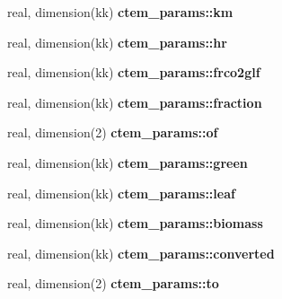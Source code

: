 \begin{DoxyCompactItemize}
\item 
\hypertarget{namespacectem__params_ad5efe1222fda4b5a9df48a9f7cf50c80}{}real, dimension(kk) {\bfseries ctem\+\_\+params\+::km}\label{namespacectem__params_ad5efe1222fda4b5a9df48a9f7cf50c80}

\item 
\hypertarget{namespacectem__params_a287abdadf856393dd133a8d5cfe1d05d}{}real, dimension(kk) {\bfseries ctem\+\_\+params\+::hr}\label{namespacectem__params_a287abdadf856393dd133a8d5cfe1d05d}

\item 
\hypertarget{namespacectem__params_a375be0a1145e49eeea706777032433d0}{}real, dimension(kk) {\bfseries ctem\+\_\+params\+::frco2glf}\label{namespacectem__params_a375be0a1145e49eeea706777032433d0}

\item 
\hypertarget{namespacectem__params_ae0ec764377ed519ca93ff09ad6dd3d39}{}real, dimension(kk) {\bfseries ctem\+\_\+params\+::fraction}\label{namespacectem__params_ae0ec764377ed519ca93ff09ad6dd3d39}

\item 
\hypertarget{namespacectem__params_a87b4020e0ac485788d2c248a82e457ed}{}real, dimension(2) {\bfseries ctem\+\_\+params\+::of}\label{namespacectem__params_a87b4020e0ac485788d2c248a82e457ed}

\item 
\hypertarget{namespacectem__params_aed5c54f73116da08b7a5d945fa639c9a}{}real, dimension(kk) {\bfseries ctem\+\_\+params\+::green}\label{namespacectem__params_aed5c54f73116da08b7a5d945fa639c9a}

\item 
\hypertarget{namespacectem__params_afd3edd012256395d4a6c63a80d5348dd}{}real, dimension(kk) {\bfseries ctem\+\_\+params\+::leaf}\label{namespacectem__params_afd3edd012256395d4a6c63a80d5348dd}

\item 
\hypertarget{namespacectem__params_a87053dc343c6f3854a58ca891eb16968}{}real, dimension(kk) {\bfseries ctem\+\_\+params\+::biomass}\label{namespacectem__params_a87053dc343c6f3854a58ca891eb16968}

\item 
\hypertarget{namespacectem__params_a402d9df702d695d3b34fe2155c31953f}{}real, dimension(kk) {\bfseries ctem\+\_\+params\+::converted}\label{namespacectem__params_a402d9df702d695d3b34fe2155c31953f}

\item 
\hypertarget{namespacectem__params_a32f230f0e1e36c2ea7c7ef57ecdc2789}{}real, dimension(2) {\bfseries ctem\+\_\+params\+::to}\label{namespacectem__params_a32f230f0e1e36c2ea7c7ef57ecdc2789}


\end{DoxyCompactItemize}
